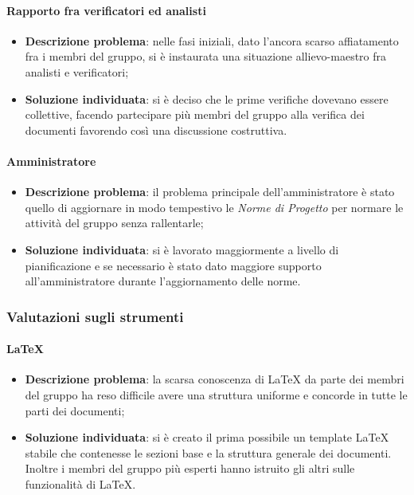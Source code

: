 		\paragraph{Rapporto fra verificatori ed analisti}
			\begin{itemize}
				\item \textbf{Descrizione problema}: nelle fasi iniziali, dato l'ancora scarso affiatamento fra i membri del gruppo, si è instaurata una situazione allievo-maestro fra analisti e verificatori;
				\item \textbf{Soluzione individuata}: si è deciso che le prime verifiche dovevano essere collettive, facendo partecipare più membri del gruppo alla verifica dei documenti favorendo così una discussione costruttiva.
			\end{itemize}
		\paragraph{Amministratore}
			\begin{itemize}
				\item \textbf{Descrizione problema}: il problema principale dell'amministratore è stato quello di aggiornare in modo tempestivo le \textit{Norme di Progetto} per normare le attività del gruppo senza rallentarle;
				\item \textbf{Soluzione individuata}: si è lavorato maggiormente a livello di pianificazione e se necessario è stato dato maggiore supporto all'amministratore durante l'aggiornamento delle norme.
			\end{itemize}
	\subsubsection{Valutazioni sugli strumenti}
		\paragraph{\LaTeX}
			\begin{itemize}
				\item \textbf{Descrizione problema}: la scarsa conoscenza di \LaTeX\xspace da parte dei membri del gruppo ha reso difficile avere una struttura uniforme e concorde in tutte le parti dei documenti;
				\item \textbf{Soluzione individuata}: si è creato il prima possibile un template \LaTeX\xspace stabile che contenesse le sezioni base e la struttura generale dei documenti. Inoltre i membri del gruppo più esperti hanno istruito gli altri sulle funzionalità di \LaTeX.
			\end{itemize}
